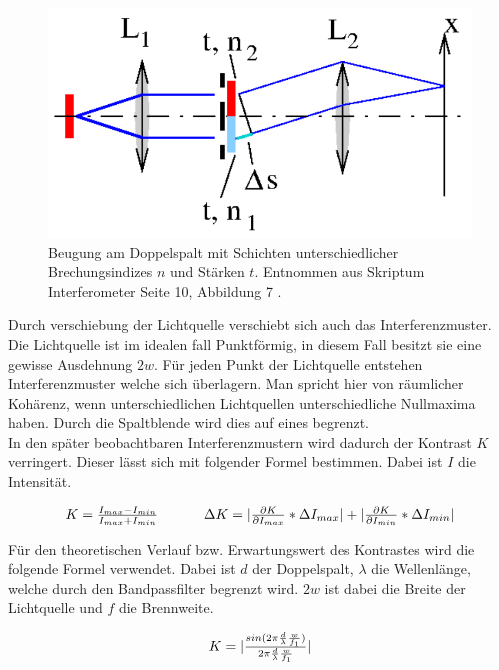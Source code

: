 \documentclass[12pt,a4paper,twoside]{article}
\begin{document}
\begin{figure}[H]
    \centering
    \includegraphics[width=0.7\linewidth]{nudes/verschiebung.png}
    \caption{Beugung am Doppelspalt mit Schichten unterschiedlicher Brechungsindizes $n$ und Stärken $t$. Entnommen aus Skriptum Interferometer Seite 10, Abbildung 7 \cite{teachcenter2}. }
    \label{fig:verschiebung}
\end{figure}

\noindent
Durch verschiebung der Lichtquelle verschiebt sich auch das Interferenzmuster. Die Lichtquelle ist im idealen fall Punktförmig, in diesem Fall besitzt sie eine gewisse Ausdehnung $2w$. 
Für jeden Punkt der Lichtquelle entstehen Interferenzmuster welche sich überlagern. Man spricht hier von räumlicher Kohärenz, wenn unterschiedlichen Lichtquellen unterschiedliche Nullmaxima haben. 
Durch die Spaltblende wird dies auf eines begrenzt. \\
In den später beobachtbaren Interferenzmustern wird dadurch der Kontrast $K$ verringert. Dieser lässt sich mit folgender Formel bestimmen. Dabei ist $I$ die Intensität. 

\begin{equation}
    \label{eq:Kontrast}
    \centerline{$K = \frac{I_{max} - I_{min}}{I_{max} + I_{min}} $ \\ $\Delta K = \vert \frac{\partial K}{\partial I_{max}} * \Delta I_{max} \vert + \vert \frac{\partial K}{\partial I_{min}} * \Delta I_{min} \vert$} %
\end{equation}

\noindent
Für den theoretischen Verlauf bzw. Erwartungswert des Kontrastes wird die folgende Formel verwendet. Dabei ist $d$ der Doppelspalt, $\lambda$ die Wellenlänge, welche durch den Bandpassfilter begrenzt wird. $2w$ ist dabei die Breite der Lichtquelle und $f$ die Brennweite. 

\begin{equation}
    \label{eq:Kontrasttheorie}
    \centerline{$K = \vert \frac{sin(2 \pi \frac{d}{\lambda} \frac{w}{f_1})}{2 \pi \frac{d}{\lambda} \frac{w}{f_1}} \vert$}
\end{equation}
\end{document}
